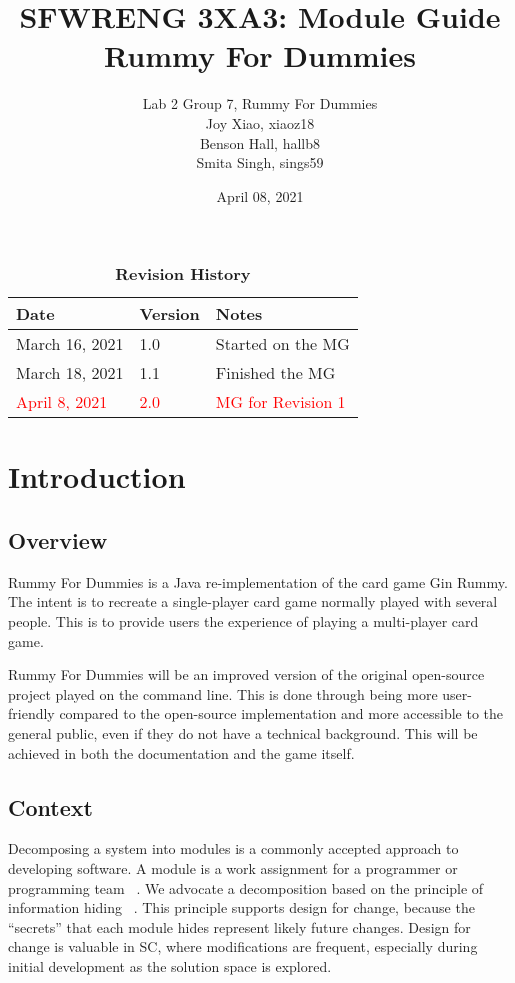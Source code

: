 \documentclass[12pt, titlepage]{article}
\title{SFWRENG 3XA3: Module Guide\\Rummy For Dummies}
\author{Lab 2 Group 7, Rummy For Dummies
		\\ Joy Xiao, xiaoz18
		\\ Benson Hall, hallb8
		\\ Smita Singh, sings59
}
\date{April 08, 2021}
\begin{document}
\maketitle

\tableofcontents
\listoftables
\listoffigures

\begin{table}[bp]
    \caption{\bf Revision History}
    \begin{tabularx}{\textwidth}{p{3cm}p{2cm}X}
        \toprule {\bf Date} & {\bf Version} & {\bf Notes}\\
        \midrule
        March 16, 2021 & 1.0 & Started on the MG\\
        March 18, 2021 & 1.1 & Finished the MG\\
        \textcolor{red}{April 8, 2021} & \textcolor{red}{2.0} & \textcolor{red}{MG for Revision 1} \\
        \bottomrule
    \end{tabularx}
\end{table}

\newpage


\section{Introduction}
\subsection{Overview}
Rummy For Dummies is a Java re-implementation of the card game Gin Rummy. The intent is to recreate a single-player card game normally played with several people. This is to provide users the experience of playing a multi-player card game. 

Rummy For Dummies will be an improved version of the original open-source project played on the command line. This is done through being more user-friendly compared to the open-source implementation and more accessible to the general public, even if they do not have a technical background. This will be achieved in both the documentation and the game itself.

\subsection{Context}
Decomposing a system into modules is a commonly accepted approach to developing software. A module is a work assignment for a programmer or programming team ~\citep{ParnasEtAl1984}.
We advocate a decomposition based on the principle of information hiding ~\citep{Parnas1972a}.
This principle supports design for change, because the ``secrets'' that each module hides represent likely future changes.  Design for change is valuable in SC, where modifications are frequent, especially during initial development as the solution space is explored.  
\end{document}
